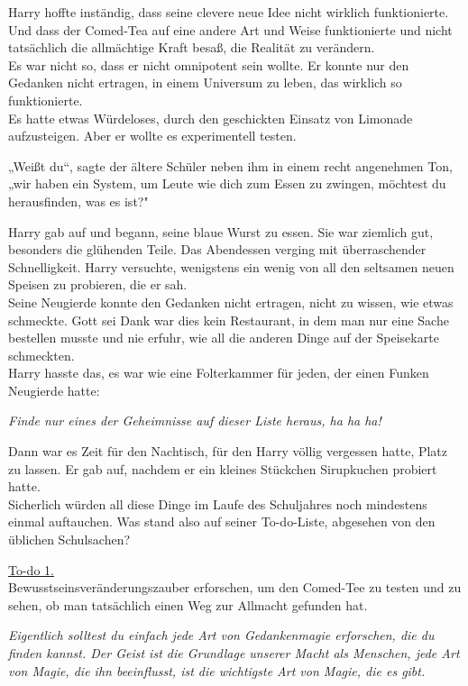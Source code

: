 {Harry hoffte inständig, dass seine clevere neue Idee nicht wirklich funktionierte.\\ Und dass der Comed-Tea auf eine andere Art und Weise funktionierte und nicht tatsächlich die allmächtige Kraft besaß, die Realität zu verändern.\\ Es war nicht so, dass er nicht omnipotent sein wollte. Er konnte nur den Gedanken nicht ertragen, in einem Universum zu leben, das wirklich so funktionierte.\\ Es hatte etwas Würdeloses, durch den geschickten Einsatz von Limonade aufzusteigen. Aber er wollte es experimentell testen.

„Weißt du“, sagte der ältere Schüler neben ihm in einem recht angenehmen Ton,\\ „wir haben ein System, um Leute wie dich zum Essen zu zwingen, möchtest du herausfinden, was es ist?"

Harry gab auf und begann, seine blaue Wurst zu essen. Sie war ziemlich gut, besonders die glühenden Teile. Das Abendessen verging mit überraschender Schnelligkeit. Harry versuchte, wenigstens ein wenig von all den seltsamen neuen Speisen zu probieren, die er sah.\\ Seine Neugierde konnte den Gedanken nicht ertragen, nicht zu wissen, wie etwas schmeckte. Gott sei Dank war dies kein Restaurant, in dem man nur eine Sache bestellen musste und nie erfuhr, wie all die anderen Dinge auf der Speisekarte schmeckten.\\ Harry hasste das, es war wie eine Folterkammer für jeden, der einen Funken Neugierde hatte:

\emph{Finde nur eines der Geheimnisse auf dieser Liste heraus, ha ha ha!}

Dann war es Zeit für den Nachtisch, für den Harry völlig vergessen hatte, Platz zu lassen. Er gab auf, nachdem er ein kleines Stückchen Sirupkuchen probiert hatte.\\ Sicherlich würden all diese Dinge im Laufe des Schuljahres noch mindestens einmal auftauchen. Was stand also auf seiner To-do-Liste, abgesehen von den üblichen Schulsachen?

\uline{To-do 1.}\\ Bewusstseinsveränderungszauber erforschen, um den Comed-Tee zu testen und zu sehen, ob man tatsächlich einen Weg zur Allmacht gefunden hat.

\emph{Eigentlich solltest du einfach jede Art von Gedankenmagie erforschen, die du finden kannst. Der Geist ist die Grundlage unserer Macht als Menschen, jede Art von Magie, die ihn beeinflusst, ist die wichtigste Art von Magie, die es gibt.}

}
